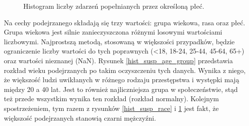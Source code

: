 \documentclass{classrep}
\begin{document}
{{{\begin{figure}[!htbp]
                    \caption{Histogram liczby zdarzeń popełnianych przez określoną płeć.}
                    \label{hist_susp_sex}
                \end{figure}
                \FloatBarrier
                Na cechy podejrzanego składają się trzy wartości: grupa wiekowa, rasa oraz płeć. Grupa wiekowa jest silnie zanieczyszczona różnymi losowymi wartościami liczbowymi. Najprostszą metodą, stosowaną w większości przypadków, będzie ograniczenie liczby wartości do tych poprawnych (<18, 18-24, 25-44, 45-64, 65+) oraz wartości nieznanej (NaN). Rysunek \ref{hist_susp_age_group} przedstawia rozkład wieku podejrzanych po takim oczyszczeniu tych danych. Wynika z niego, że większość ludzi uwikłanych w różnego rodzaju przestępstwa i występki mają między 20 a 40 lat. Jest to również najliczniejsza grupa w społeczeństwie, stąd też przede wszystkim wynika ten rozkład (rozkład normalny). Kolejnym spostrzeżeniem, tym razem z rysunków \ref{hist_susp_race} i \ref{hist_susp_sex} jest fakt, że większość podejrzanych stanowią czarni mężczyźni.
            }

}}
\end{document}
